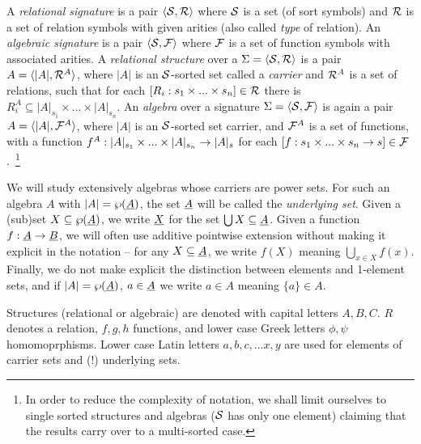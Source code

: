 \documentclass[10pt]{article}
\begin{document}
A {\em relational signature\/}
 is a pair $\langle{\cal S},{\cal R} \rangle$ where ${\cal S}$ is a set (of sort symbols)
and ${\cal R}$ is a set of relation symbols with given arities (also called
{\em type} of relation).
An {\em algebraic signature\/} is a pair $\langle{\cal S},{\cal F} \rangle$ where 
${\cal F}$ is a set of function symbols with associated arities.
A {\em relational structure\/} over a $\Sigma=\langle{\cal S},{\cal R}\rangle$
is a pair $A= \langle|A|, {\cal R}^A\rangle$, where $|A|$ is
an ${\cal S}$-sorted set called a {\em carrier\/} and ${\cal R}^A$ is a set of
relations, such that for each $[R_i : s_1\times...\times s_n]\in {\cal R}$
there is $R_i^A \subseteq |A|_{s_1}\times...\times |A|_{s_n}$. 
An {\em algebra\/} over a signature $\Sigma=\langle{\cal S},{\cal F}\rangle$ 
is again a pair $A= \langle|A|, {\cal F}^A\rangle$, where $|A|$ is
an ${\cal S}$-sorted set carrier, and ${\cal F}^A$ is a set of
functions, with a function $f^A : |A|_{s_1}\times...\times |A|_{s_n} \rightarrow
|A|_s$ for each $[f : s_1\times...\times s_n\rightarrow s]\in {\cal F}$.~\footnote{In order 
to reduce the complexity of notation, we shall limit
ourselves to single sorted structures and algebras 
(${\cal S}$ has only  one element)
claiming that the results carry over to a multi-sorted case.}

We will study extensively algebras whose carriers are
power sets. 
For such an algebra $A$ with $|A|=\wp(\underline {A})$, the
set $\underline {A}$ will be called the {\em underlying set}. 
Given a (sub)set $X\subseteq\wp(\underline {A})$, 
we write $\underline {X}$ for the set $\bigcup X\subseteq\underline {A}$. 
Given a function $f:\underline {A}\rightarrow \underline {B}$, we will often use additive pointwise extension
without making it explicit in the notation -- for any $X\subseteq \underline {A}$, we write
$f(X)$ meaning $\bigcup_{x\in X} f(x)$.
Finally, we do not make explicit the distinction
between elements and 1-element sets, and if $|A|=\wp(\underline {A})$, $a\in\underline {A}$ we write $a\in A$ meaning $\{a\}\in A$.

Structures (relational or algebraic) are denoted with capital letters $A,B,C$.
$R$ denotes a relation, $f,g,h$ functions, and lower case Greek letters
$\phi,\psi$ homomoprphisms.
 Lower case Latin letters $a,b,c,... 
x,y$ are used for elements of carrier sets and (!) underlying sets. 
\end{document}
